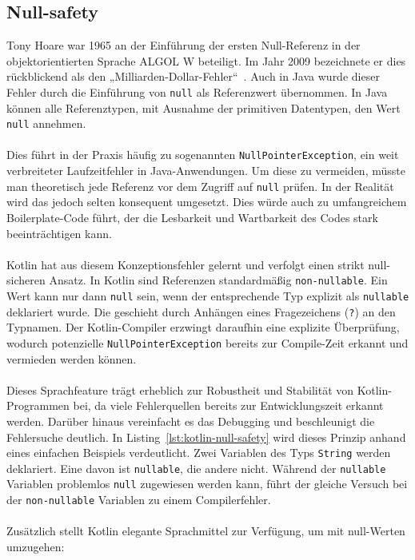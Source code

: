 \documentclass[11pt]{article}
\begin{document}
    \subsection{Null-safety}
    Tony Hoare war 1965 an der Einführung der ersten Null-Referenz in der objektorientierten Sprache ALGOL W beteiligt.
    Im Jahr 2009 bezeichnete er dies rückblickend als den „Milliarden-Dollar-Fehler“~\cite{billion-dollar-mistake}.
    Auch in Java wurde dieser Fehler durch die Einführung von \texttt{null} als Referenzwert übernommen.
    In Java können alle Referenztypen, mit Ausnahme der primitiven Datentypen, den Wert \texttt{null} annehmen.\\
    \\
    Dies führt in der Praxis häufig zu sogenannten \texttt{NullPointerException}, ein weit verbreiteter Laufzeitfehler in Java-Anwendungen.
    Um diese zu vermeiden, müsste man theoretisch jede Referenz vor dem Zugriff auf \texttt{null} prüfen.
    In der Realität wird das jedoch selten konsequent umgesetzt.
    Dies würde auch zu umfangreichem Boilerplate-Code führt, der die Lesbarkeit und Wartbarkeit des Codes stark beeinträchtigen kann.\\
    \\
    Kotlin hat aus diesem Konzeptionsfehler gelernt und verfolgt einen strikt null-sicheren Ansatz.
    In Kotlin sind Referenzen standardmäßig \texttt{non-nullable}.
    Ein Wert kann nur dann \texttt{null} sein, wenn der entsprechende Typ explizit als \texttt{nullable} deklariert wurde.
    Die geschieht durch Anhängen eines Fragezeichens (\texttt{?}) an den Typnamen.
    Der Kotlin-Compiler erzwingt daraufhin eine explizite Überprüfung, wodurch potenzielle \texttt{NullPointerException} bereits zur Compile-Zeit erkannt und vermieden werden können.\\
    \\
    Dieses Sprachfeature trägt erheblich zur Robustheit und Stabilität von Kotlin-Programmen bei, da viele Fehlerquellen bereits zur Entwicklungszeit erkannt werden.
    Darüber hinaus vereinfacht es das Debugging und beschleunigt die Fehlersuche deutlich.
    In Listing~\ref{lst:kotlin-null-safety} wird dieses Prinzip anhand eines einfachen Beispiels verdeutlicht.
    Zwei Variablen des Typs \texttt{String} werden deklariert.
    Eine davon ist \texttt{nullable}, die andere nicht.
    Während der \texttt{nullable} Variablen problemlos \texttt{null} zugewiesen werden kann, führt der gleiche Versuch bei der \texttt{non-nullable} Variablen zu einem Compilerfehler.\\
    \\
    Zusätzlich stellt Kotlin elegante Sprachmittel zur Verfügung, um mit null-Werten umzugehen:
\end{document}
